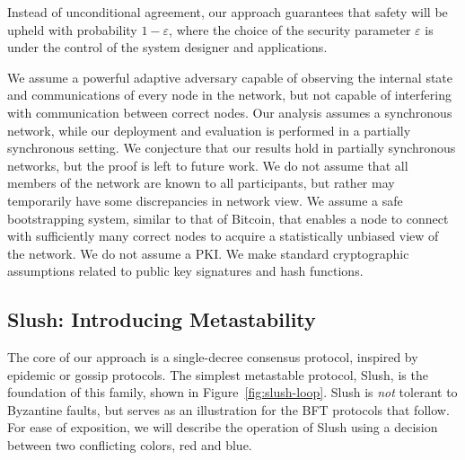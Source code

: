 \documentclass[letterpaper,twocolumn,10pt]{article}
\newcommand{\tronly}[2]{#1}
\theoremstyle{definition}
\begin{document}
Instead of unconditional agreement, our approach guarantees that safety will be upheld with probability $1-\varepsilon$, where the choice of the security parameter $\varepsilon$ is under the control of the system designer and applications.

We assume a powerful adaptive adversary capable of observing the internal state and communications of every node in the network, but not capable of interfering with communication between correct nodes.
Our analysis assumes a synchronous network, while our deployment and evaluation is performed in a partially synchronous setting.
We conjecture that our results hold in partially synchronous networks, but the proof is left to future work.
We do not assume that all members of the network are known to all participants, but rather may temporarily have some discrepancies in network view.
We assume a safe bootstrapping system, similar to that of Bitcoin, that enables a node to connect with sufficiently many correct nodes to acquire a statistically unbiased view of the network.
We do not assume a PKI\@.
We make standard cryptographic assumptions related to public key signatures and hash functions.

\subsection{Slush: Introducing Metastability}\tronly{}{\vspace{-0.5em}}
The core of our approach is a single-decree consensus protocol,
inspired by epidemic or gossip protocols.
%
The simplest metastable protocol, Slush, is the foundation of this family, shown in Figure~\ref{fig:slush-loop}.
Slush is \emph{not} tolerant to Byzantine faults, but serves as an illustration for the BFT protocols that follow.
For ease of exposition, we will describe the operation of Slush using a decision between two conflicting colors, red and blue.
\end{document}
